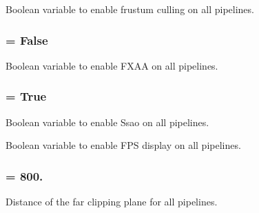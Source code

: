 \-Boolean variable to enable frustum culling on all pipelines. 

\hypertarget{classlib_1_1User_1_1User_a24f3431fbd7ec6be6d4358854cf9ba8c}{
\subsubsection[{enable\-\_\-fxaa}]{ = \-False}}\label{classlib_1_1User_1_1User_a24f3431fbd7ec6be6d4358854cf9ba8c}


\-Boolean variable to enable \-F\-X\-A\-A on all pipelines. 

\hypertarget{classlib_1_1User_1_1User_a5a5a10220b495e9b86d62699819222c4}{
\subsubsection[{enable\-\_\-ssao}]{ = \-True}}\label{classlib_1_1User_1_1User_a5a5a10220b495e9b86d62699819222c4}


\-Boolean variable to enable \-Ssao on all pipelines. 

\-Boolean variable to enable \-F\-P\-S display on all pipelines.\hypertarget{classlib_1_1User_1_1User_afef9ed6223dcef7768e39b7f134c94f6}{
\subsubsection[{far\-\_\-clip}]{ = 800.}}\label{classlib_1_1User_1_1User_afef9ed6223dcef7768e39b7f134c94f6}


\-Distance of the far clipping plane for all pipelines. 

